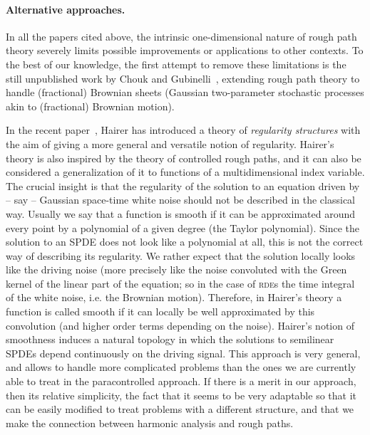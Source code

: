 \documentclass[11pt,a4paper]{article}
\theoremstyle{remark}
\begin{document}
\paragraph{Alternative approaches.}

In all the papers cited above, the intrinsic one-dimensional nature of rough path theory severely limits possible improvements or applications to other contexts. To the best of our knowledge, the first attempt to remove these limitations is the still unpublished work by Chouk and Gubinelli~\cite{Chouk2013}, extending rough path theory to handle (fractional) Brownian sheets (Gaussian two-parameter stochastic processes akin to (fractional) Brownian motion).

In the recent paper~\cite{Hairer2013a}, Hairer has introduced a theory of \emph{regularity structures} with the aim of giving a more general and versatile notion of regularity. Hairer's theory is also inspired by the theory of controlled rough paths, and it can also be considered a generalization of it to functions of a multidimensional index variable. The crucial insight is that the regularity of the solution to an equation driven by -- say -- Gaussian space-time white noise should not be described in the classical way. Usually we say that a function is smooth if it can be approximated around every point by a polynomial of a given degree (the Taylor polynomial). Since the solution to an SPDE does not look like a polynomial at all, this is not the correct way of describing its regularity. We rather expect that the solution locally looks like the driving noise (more precisely like the noise convoluted with the Green kernel of the linear part of the equation; so in the case of \textsc{rde}s the time integral of the white noise, i.e. the Brownian motion). Therefore, in Hairer's theory a function is called smooth if it can locally be well approximated by this convolution (and higher order terms depending on the noise). Hairer's notion of smoothness induces a natural topology in which the solutions to semilinear SPDEs depend continuously on the driving signal. This approach is very general, and allows to handle more complicated problems than the ones we are currently able to treat in the paracontrolled approach. If there is a merit in our approach, then its relative simplicity, the fact that it seems to be very adaptable so that it can be easily modified to treat problems with a different structure, and that we make the connection between harmonic analysis and rough paths.
\end{document}
